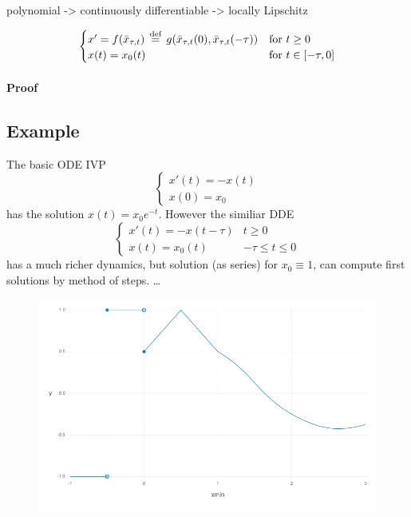 \documentclass[10pt]{article}
\begin{document}
polynomial -\textgreater{} continuously differentiable -\textgreater{} locally Lipschitz


\begin{equation}
    \begin{cases}
        x'=f(\bar{x}_{\tau,t})\,\stackrel{\text{def}}{=}\, g(\bar{x}_{\tau,t}(0),\bar{x}_{\tau,t}(-\tau)) &\text{for } t\geq 0\\
        x(t)=x_0(t) & \text{for } t\in[-\tau,0]
    \end{cases}
\end{equation}

\paragraph{Proof}\label{proof-2}

\subsection{Example}\label{example}
The basic ODE IVP
\begin{equation}
    \begin{cases}
        x'(t) = -x(t)\\
        x(0) = x_0
    \end{cases}
\end{equation}
has the solution $x(t)=x_0 e^{-t}$. However the similiar DDE
\begin{equation}
    \begin{cases}
        x'(t) = -x(t-\tau) & t\geq 0\\
        x(t) = x_0(t) & -\tau\leq t\leq 0
    \end{cases}
\end{equation}
has a much richer dynamics, but solution (as series) for $x_0\equiv 1$, can compute first solutions by method of steps. \ldots{}

\begin{figure}[h]\centering
    \includegraphics[width=\textwidth]{piecewise-initial-function.png}
	\label{fig:not-allowed}
\end{figure}
\end{document}
